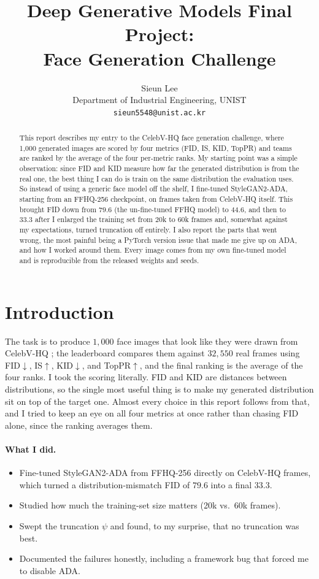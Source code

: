 \documentclass{article}
\title{Deep Generative Models Final Project: \\
Face Generation Challenge}
\author{%
  Sieun Lee \\
  Department of Industrial Engineering, UNIST \\
  \texttt{sieun5548@unist.ac.kr} \\
}
\begin{document}
\maketitle

\begin{abstract}
This report describes my entry to the CelebV-HQ face generation challenge, where 1{,}000 generated
images are scored by four metrics (FID, IS, KID, TopPR) and teams are ranked by the average of the four
per-metric ranks. My starting point was a simple observation: since FID and KID measure how far the
generated distribution is from the real one, the best thing I can do is train on the same distribution
the evaluation uses. So instead of using a generic face model off the shelf, I fine-tuned StyleGAN2-ADA,
starting from an FFHQ-256 checkpoint, on frames taken from CelebV-HQ itself. This brought FID down from
$79.6$ (the un-fine-tuned FFHQ model) to $44.6$, and then to $33.3$ after I enlarged the training set
from $20$k to $60$k frames and, somewhat against my expectations, turned truncation off entirely. I also
report the parts that went wrong, the most painful being a PyTorch version issue that made me give up on
ADA, and how I worked around them. Every image comes from my own fine-tuned model and is reproducible
from the released weights and seeds.
\end{abstract}

\section{Introduction}
The task is to produce $1{,}000$ face images that look like they were drawn from CelebV-HQ
\citep{zhu2022celebvhq}; the leaderboard compares them against $32{,}550$ real frames using
FID$\downarrow$, IS$\uparrow$, KID$\downarrow$, and TopPR$\uparrow$, and the final ranking is the average
of the four ranks. I took the scoring literally. FID and KID are distances between distributions, so the
single most useful thing is to make my generated distribution sit on top of the target one. Almost every
choice in this report follows from that, and I tried to keep an eye on all four metrics at once rather
than chasing FID alone, since the ranking averages them.

\paragraph{What I did.}
\begin{itemize}
\itemsep0.15em
\item Fine-tuned StyleGAN2-ADA from FFHQ-256 directly on CelebV-HQ frames, which turned a
distribution-mismatch FID of $79.6$ into a final $33.3$.
\item Studied how much the training-set size matters (20k vs.\ 60k frames).
\item Swept the truncation $\psi$ and found, to my surprise, that no truncation was best.
\item Documented the failures honestly, including a framework bug that forced me to disable ADA.
\end{itemize}
\end{document}
